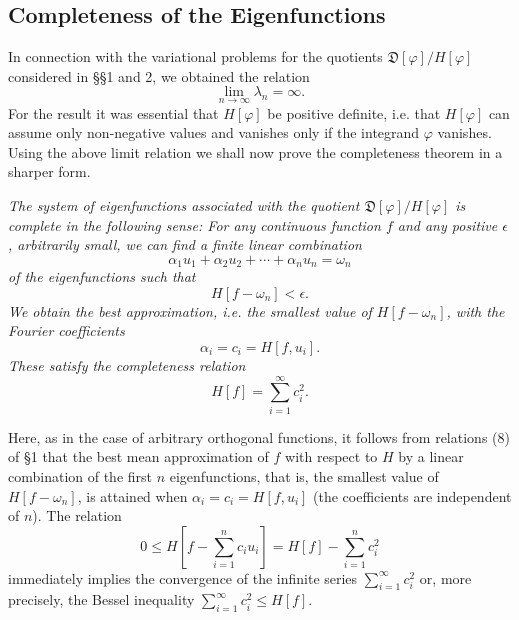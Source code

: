 \subsection{Completeness of the Eigenfunctions}
In connection with the variational problems for the quotients $\mathfrak D[\varphi]/H[\varphi]$ considered in \S\S1 and 2, we obtained the relation
\[
\lim_{n\to\infty}\lambda_n=\infty.
\]
For the result it was essential that $H[\varphi]$ be positive definite, i.e. that $H[\varphi]$ can assume only non-negative values and vanishes only if the integrand $\varphi$ vanishes. Using the above limit relation we shall now prove the completeness theorem in a sharper form.

\emph{The system of eigenfunctions associated with the quotient $\mathfrak D[\varphi]/H[\varphi]$ is complete in the following sense: For any continuous function $f$ and any positive $\epsilon$, arbitrarily small, we can find a finite linear combination}
\[
\alpha_1u_1+\alpha_2u_2+\cdots+\alpha_nu_n=\omega_n
\]
\emph{of the eigenfunctions such that}
\[
H[f-\omega_n]<\epsilon.
\]
\emph{We obtain the best approximation, i.e. the smallest value of $H[f-\omega_n]$, with the Fourier coefficients}
\[
\alpha_i=c_i=H[f,u_i].
\]
\emph{These satisfy the completeness relation}
\begin{equation}\tag{23}
H[f]=\sum_{i=1}^\infty c_i^2.
\end{equation}

Here, as in the case of arbitrary orthogonal functions, it follows from relations (8) of \S1 that the best mean approximation of $f$ with respect to $H$ by a linear combination of the first $n$ eigenfunctions, that is, the smallest value of $H[f-\omega_n]$, is attained when $\alpha_i=c_i=H[f,u_i]$ (the coefficients are independent of $n$). The relation
\[
0\le H\left[f-\sum_{i=1}^n c_i u_i\right]=H[f]-\sum_{i=1}^n c_i^2
\]
immediately implies the convergence of the infinite series $\sum_{i=1}^\infty c_i^2$ or, more precisely, the Bessel inequality $\sum_{i=1}^\infty c_i^2\le H[f]$.

